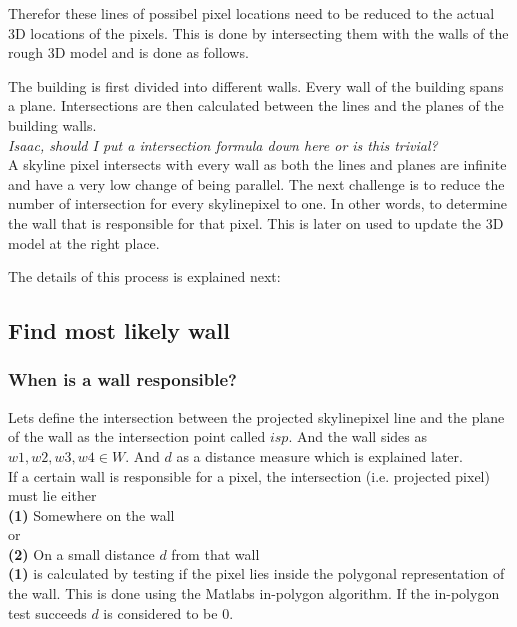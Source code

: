 \documentclass[10pt]{article}
\begin{document}
Therefor these lines of possibel pixel locations need to
be reduced to the actual 3D locations of the pixels.  This is done by intersecting
them with the walls of the rough 3D model and is done as follows.

The building is first divided into different walls.  Every wall of the building spans a plane. 
Intersections are then calculated between the lines and the planes of the building walls.\\
\textit{Isaac, should I put a intersection formula down here or is this trivial?}\\

A skyline pixel intersects with every wall as both the lines and planes are
infinite and have a very low change of being parallel.
The next challenge is to reduce the number of intersection for every skylinepixel
to one. In other words, to determine the wall that is responsible for that pixel. 
This is later on used to update the 3D model at the right place.

The details of this process is explained next:

\subsection{Find most likely wall}
\subsubsection{When is a wall responsible?}
Lets define the intersection between the projected skylinepixel line and the
plane of the wall as the intersection point called $isp$. And the wall sides as ${w1, w2,
w3, w4 \in W}$. And $d$ as a distance measure which is explained later.\\ 
If a certain wall is responsible for a pixel, the intersection (i.e. projected
pixel) must lie either\\

\textbf{(1)} Somewhere on the wall 
\\
or
\\
\textbf{(2)} On a small distance $d$ from that wall\\
\textbf{(1)} is calculated by testing if the pixel lies inside the polygonal
representation of the wall. This is done using the Matlabs in-polygon
algorithm. If the in-polygon test succeeds $d$ is considered to be 0.\\
\end{document}

